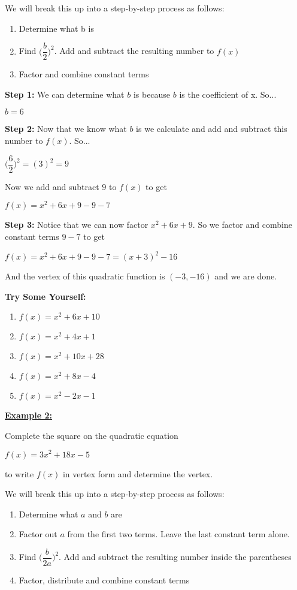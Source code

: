 \documentclass[12pt]{article}
\newenvironment{myindentpar}[1]%
     {\begin{list}{}%
             {\setlength{\leftmargin}{#1}}%
             \item[]%
     }
     {\end{list}}
\begin{document}
We will break this up into a step-by-step process as follows: 

\begin{enumerate}
\item Determine what b is
\item Find $\Big(\dfrac{b}{2}\Big)^2$. Add and subtract the resulting number to $f(x)$
\item Factor and combine constant terms
\end{enumerate}

\textbf{Step 1:}
We can determine what $b$ is because $b$ is the coefficient of x. So...

$b =6$

\textbf{Step 2:} Now that we know what $b$ is we calculate and add and subtract this number to $f(x)$. So...

$\Big(\dfrac{6}{2}\Big)^2 = (3)^2 = 9$ 

Now we add and subtract $9$ to $f(x)$ to get 

$f(x) = x^2 + 6x + 9 - 9 - 7$

\textbf{Step 3:} Notice that we can now factor $x^2 +6x+9$. So we factor and combine constant terms $9 - 7$ to get 

$f(x)= x^2 +6x +9 - 9 - 7=(x + 3)^2 - 16$ 

And the vertex of this quadratic function is $(-3, -16)$ and we are done.

\textbf{Try Some Yourself:}

\begin{enumerate}
\item $f(x)= x^2 +6x + 10$
\item $f(x)= x^2 +4x +1$
\item $f(x)= x^2 + 10x + 28$
\item $f(x)= x^2 +8x - 4$
\item $f(x)= x^2 - 2x - 1$
\end{enumerate}

{\bf \underline{Example 2:}}

\begin{myindentpar}{1cm}Complete the square on the quadratic equation 
\newline

\centerline{$f(x)=3x^2 + 18x - 5$}

to write $f(x)$ in vertex form and determine the vertex. 
\end{myindentpar}
We will break this up into a step-by-step process as follows:

\begin{enumerate}
\item Determine what $a$ and $b$ are
\item Factor out $a$ from the first two terms. Leave the last constant term alone.
\item Find $\Big(\dfrac{b}{2a}\Big)^2$. Add and subtract the resulting number inside the parentheses
\item Factor, distribute and combine constant terms 
\end{enumerate}
\end{document}
